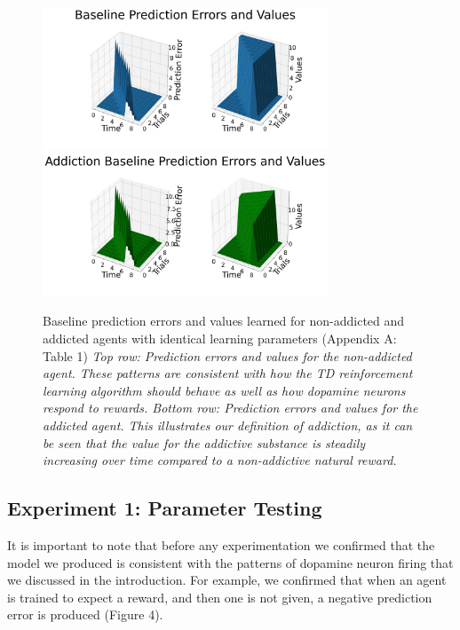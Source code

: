 \documentclass[10pt,letterpaper]{article}
\begin{document}
\begin{figure}[H]
   \centering
    \includegraphics[width = 85mm]{graphs/comp.png}
    \includegraphics[width = 85mm]{graphs/addicted_comparison.png}
    \caption{Baseline prediction errors and values learned for non-addicted and addicted agents with identical learning parameters (Appendix A: Table 1)
    \newline \emph{Top row: Prediction errors and values for the non-addicted agent. These patterns are consistent with how the TD reinforcement learning algorithm should behave as well as how dopamine neurons respond to rewards. \newline Bottom row: Prediction errors and values for the addicted agent. This illustrates our definition of addiction, as it can be seen that the value for the addictive substance is steadily increasing over time compared to a non-addictive natural reward.}}
    \label{fig:Baseline}
\end{figure}

\vspace{4.5em}

\subsection{Experiment 1: Parameter Testing}
It is important to note that before any experimentation we confirmed that the model we produced is consistent with the patterns of dopamine neuron firing that we discussed in the introduction. For example, we confirmed that when an agent is trained to expect a reward, and then one is not given, a negative prediction error is produced (Figure 4). 
\end{document}
